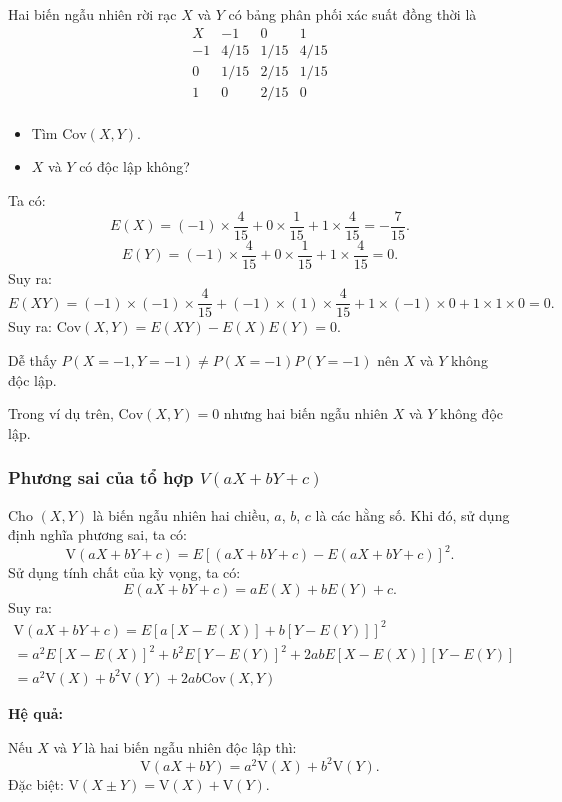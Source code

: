 \documentclass[12pt,a4paper]{article}
\begin{document}
\begin{vidu}
Hai biến ngẫu nhiên rời rạc $X$ và $Y$ có bảng phân phối xác suất đồng thời là
\[
  \begin{array}{c|ccc}
    X & -1 & 0 & 1 \\
    \hline
    -1 & 4/15 & 1/15 & 4/15 \\
    0 & 1/15 & 2/15 & 1/15 \\
    1 & 0 & 2/15 & 0 \\
  \end{array}
\]
\begin{itemize}
  \item Tìm $\mathrm{Cov}(X, Y )$.
  \item $X$ và $Y$ có độc lập không?
\end{itemize}

Ta có:
\[
  E(X) = (-1) \times \dfrac{4}{15} + 0 \times \dfrac{1}{15} + 1 \times \dfrac{4}{15} = -\dfrac{7}{15}.
\]
\[
  E(Y ) = (-1) \times \dfrac{4}{15} + 0 \times \dfrac{1}{15} + 1 \times \dfrac{4}{15} = 0.
\]
Suy ra:
\[
  E(XY) = (-1) \times (-1) \times \dfrac{4}{15} + (-1) \times (1) \times \dfrac{4}{15} + 1 \times (-1) \times 0 + 1 \times 1 \times 0 = 0.
\]
Suy ra: $\mathrm{Cov}(X, Y) = E(XY) - E(X)E(Y) = 0$.

Dễ thấy $P(X = -1, Y = -1) \neq P(X = -1)P(Y = -1)$ nên $X$ và $Y$ không độc lập.

Trong ví dụ trên, $\mathrm{Cov}(X, Y) = 0$ nhưng hai biến ngẫu nhiên $X$ và $Y$ không độc lập.
\end{vidu}

\subsubsection{Phương sai của tổ hợp $V(aX + bY + c)$}

\begin{dinhly}
Cho $(X, Y)$ là biến ngẫu nhiên hai chiều, $a$, $b$, $c$ là các hằng số. Khi đó, sử dụng định nghĩa phương sai, ta có:
\[
  \mathrm{V}(aX + bY + c) = E[(aX + bY + c) - E(aX + bY + c)]^2.
\]
Sử dụng tính chất của kỳ vọng, ta có:
\[
  E(aX + bY + c) = aE(X) + bE(Y) + c.
\]
Suy ra:
\begin{align*}
  \mathrm{V}(aX + bY + c) = E[a[X - E(X)] + b[Y - E(Y)]]^2
  \\= a^2E[X - E(X)]^2 + b^2E[Y - E(Y)]^2 + 2abE{[X - E(X)][Y - E(Y)]}
  \\= a^2\mathrm{V}(X) + b^2\mathrm{V}(Y) + 2ab\mathrm{Cov}(X, Y)
\end{align*}

\textbf{Hệ quả:}

Nếu $X$ và $Y$ là hai biến ngẫu nhiên độc lập thì:
\[
  \mathrm{V}(aX + bY) = a^2\mathrm{V}(X) + b^2\mathrm{V}(Y).
\]
Đặc biệt: $\mathrm{V}(X \pm Y) = \mathrm{V}(X) + \mathrm{V}(Y)$.
\end{dinhly}
\end{document}
